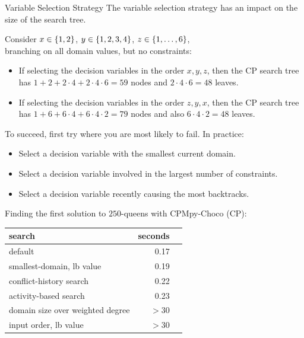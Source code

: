 \documentclass{cons-beamer}
\begin{document}
\begin{frame}{Variable Selection Strategy}
  The variable selection strategy has an impact on the size of the
  search tree.
  \vfill

  \begin{example}
    Consider $x \in \left\{1,2\right\}$, $y \in \left\{1,2,3,4\right\}$, $z \in \left\{1,\dots,6\right\}$, \\
    branching on all domain values, but no constraints: \vfill
    \begin{itemize}
      \item If selecting the decision variables in the order
        $x, y, z$, then the CP search tree has 
        $1 + 2 + 2 \cdot 4 + 2 \cdot 4 \cdot 6 = 59$
        nodes and $2 \cdot 4 \cdot 6 = 48$ leaves.
        \vfill

      \item If selecting the decision variables in the order
        $z, y, x$, then the CP search tree has
        $1 + 6 + 6 \cdot 4 + 6 \cdot 4 \cdot 2 = 79$
        nodes and also $6 \cdot 4 \cdot 2 = 48$ leaves.
    \end{itemize}
  \end{example}
\end{frame}

\begin{frame}\label{var}
  \begin{definition}
    To succeed, first try where you are most likely to fail. 
    In practice:
    \begin{itemize}
      \item Select a decision variable with the smallest current domain.
      \item Select a decision variable involved in the largest number of constraints.
      \item Select a decision variable recently causing the most backtracks.
    \end{itemize}
  \end{definition}
  \vfill

  \begin{example}
    Finding the first solution to $250$-queens with CPMpy-Choco
    (CP):
    \begin{center}
      \begin{tabular}{lrr}
        search & seconds \\
        \midrule
        default & 0.17 \\
        smallest-domain, lb value & 0.19 \\
        conflict-history search & 0.22 \\
        activity-based search & 0.23 \\
        domain size over weighted degree & $>30$ \\
        input order, lb value & $>30$ \\
      \end{tabular}
    \end{center}
  \end{example}
\end{frame}
\end{document}
